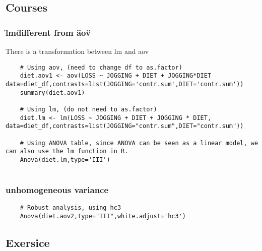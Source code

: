 \subsection{Courses}
\lstset{language=R}

\subsubsection{\"lm\" different from \"aov\"}
There is a transformation between lm and aov
\begin{lstlisting}
    # Using aov, (need to change df to as.factor)
    diet.aov1 <- aov(LOSS ~ JOGGING + DIET + JOGGING*DIET data=diet_df,contrasts=list(JOGGING='contr.sum',DIET='contr.sum'))
    summary(diet.aov1)

    # Using lm, (do not need to as.factor)
    diet.lm <- lm(LOSS ~ JOGGING + DIET + JOGGING * DIET, data=diet_df,contrasts=list(JOGGING="contr.sum",DIET="contr.sum"))

    # Using ANOVA table, since ANOVA can be seen as a linear model, we can also use the lm function in R.
    Anova(diet.lm,type='III')
    
\end{lstlisting}

\subsubsection{unhomogeneous variance}
\begin{lstlisting}
    # Robust analysis, using hc3
    Anova(diet.aov2,type="III",white.adjust='hc3')
\end{lstlisting}


\subsection{Exersice}

